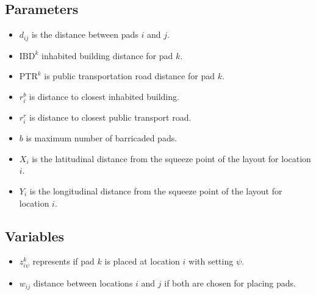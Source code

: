 \documentclass[10pt]{article}
\begin{document}
	\subsection{Parameters}
	\begin{itemize}
		\item $d_{ij}$ is the distance between pads $ i $ and $ j $.
		\item $\text{IBD}^k$ inhabited building distance for pad $ k $.
		\item $\text{PTR}^k$ is public transportation road distance for pad $ k $.
		\item $ r_i^b $ is distance to closest inhabited building.
		\item $ r_i^r $ is distance to closest public transport road.
		\item $ b $ is maximum number of barricaded pads.
		\item $ X_i $ is the latitudinal distance from the squeeze point of the layout for location $ i $.
		\item $ Y_i $ is the longitudinal distance from the squeeze point of the layout for location $ i $.
	\end{itemize}
	
	\subsection{Variables}
	\begin{itemize}
		\item $z_{i\psi}^{k} $ represents if pad $ k $ is placed at location $ i $ with setting $ \psi $.
		\item $ w_{ij} $ distance between locations $ i $ and $ j $ if both are chosen for placing pads.
	\end{itemize}
\end{document}
